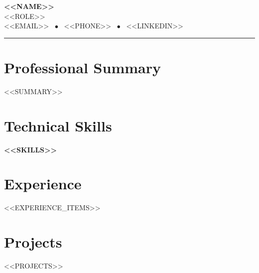 \documentclass[letterpaper,11pt]{article}
\begin{document}
\begin{center}
  {\Huge \textbf{<<NAME>>}} \\[6pt]
  {\large \color{accent} <<ROLE>>} \\[6pt]
  \small <<EMAIL>> \ $\bullet$ \ <<PHONE>> \ $\bullet$ \ <<LINKEDIN>>
\end{center}

\vspace{4pt}
\noindent\rule{\textwidth}{1.5pt}
\vspace{2pt}

\section{Professional Summary}
<<SUMMARY>>

\section{Technical Skills}
\textbf{<<SKILLS>>}

\section{Experience}
\begin{itemize}[leftmargin=*, itemsep=3pt]
<<EXPERIENCE_ITEMS>>
\end{itemize}

\section{Projects}
<<PROJECTS>>
\end{document}
